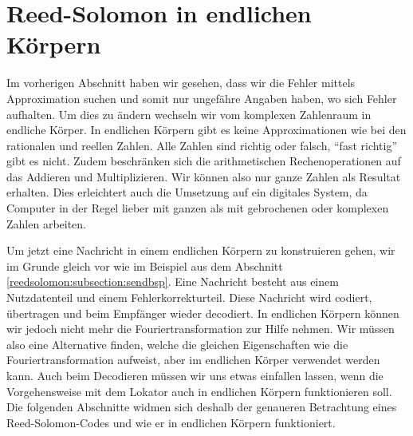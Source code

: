 %
%
%
\section{Reed-Solomon in endlichen Körpern
\label{reedsolomon:section:endlichekoerper}}
Im vorherigen Abschnitt haben wir gesehen, dass wir die Fehler mittels Approximation suchen und somit nur ungefähre Angaben haben, wo sich Fehler aufhalten. 
Um dies zu ändern wechseln wir vom komplexen Zahlenraum in endliche Körper.
In endlichen Körpern gibt es keine Approximationen wie bei den rationalen und reellen Zahlen. 
Alle Zahlen sind richtig oder falsch, ``fast richtig'' gibt es nicht.
Zudem beschränken sich die arithmetischen Rechenoperationen auf das Addieren und Multiplizieren. 
Wir können also nur ganze Zahlen als Resultat erhalten.
Dies erleichtert auch die Umsetzung auf ein digitales System, da Computer in der Regel lieber mit ganzen als mit gebrochenen oder komplexen Zahlen arbeiten. 

Um jetzt eine Nachricht in einem endlichen Körpern zu konstruieren gehen, wir im Grunde gleich vor wie im Beispiel aus dem Abschnitt \ref{reedsolomon:subsection:sendbsp}.
Eine Nachricht besteht aus einem Nutzdatenteil und einem Fehlerkorrekturteil. 
Diese Nachricht wird codiert, übertragen und beim Empfänger wieder decodiert. 
In endlichen Körpern können wir jedoch nicht mehr die Fouriertransformation zur Hilfe nehmen.
Wir müssen also eine Alternative finden, welche die gleichen Eigenschaften wie die Fouriertransformation aufweist, aber im endlichen Körper verwendet werden kann.
Auch beim Decodieren müssen wir uns etwas einfallen lassen, wenn die Vorgehensweise mit dem Lokator auch in endlichen Körpern funktionieren soll. Die folgenden Abschnitte widmen sich deshalb der genaueren Betrachtung eines Reed-Solomon-Codes und wie er in endlichen Körpern funktioniert. 

